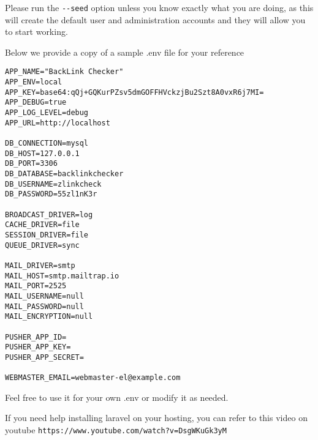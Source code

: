 Please run the \verb|--seed| option unless you know exactly what you are doing, as this will create the default user and administration accounts and they will allow you to start working.

Below we provide a copy of a sample .env file for your reference
\begin{verbatim}
APP_NAME="BackLink Checker"
APP_ENV=local
APP_KEY=base64:qQj+GQKurPZsv5dmGOFFHVckzjBu2Szt8A0vxR6j7MI=
APP_DEBUG=true
APP_LOG_LEVEL=debug
APP_URL=http://localhost

DB_CONNECTION=mysql
DB_HOST=127.0.0.1
DB_PORT=3306
DB_DATABASE=backlinkchecker
DB_USERNAME=zlinkcheck
DB_PASSWORD=55zl1nK3r

BROADCAST_DRIVER=log
CACHE_DRIVER=file
SESSION_DRIVER=file
QUEUE_DRIVER=sync

MAIL_DRIVER=smtp
MAIL_HOST=smtp.mailtrap.io
MAIL_PORT=2525
MAIL_USERNAME=null
MAIL_PASSWORD=null
MAIL_ENCRYPTION=null

PUSHER_APP_ID=
PUSHER_APP_KEY=
PUSHER_APP_SECRET=

WEBMASTER_EMAIL=webmaster-el@example.com
\end{verbatim}

Feel free to use it for your own .env or modify it as needed.

If you need help installing laravel on your hosting, you can refer to this video on youtube \verb|https://www.youtube.com/watch?v=DsgWKuGk3yM|